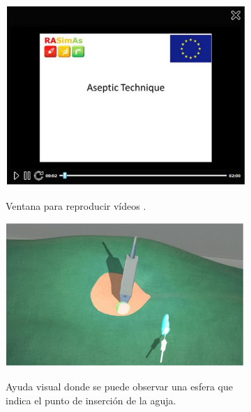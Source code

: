 \begin{figure}[h]
    \begin{subfigure}[b]{0.5\linewidth}
        \centering
        {\includegraphics[width=\linewidth]{IMG/video.PNG}}
        \caption{Ventana para reproducir vídeos
    \label{fig:video}.}
    \end{subfigure}
    \null\hfill
     \begin{subfigure}[b]{0.5\linewidth}
        \centering
        {\includegraphics[width=\linewidth]{IMG/viewhelp.PNG}}
        \caption{Ayuda visual donde se puede observar una esfera que indica el punto de inserción de la aguja.
    \label{fig:viewhelp}}
    \end{subfigure}
    \begin{subfigure}[b]{0.55\linewidth}
        \centering

\end{subfigure}
\end{figure}
